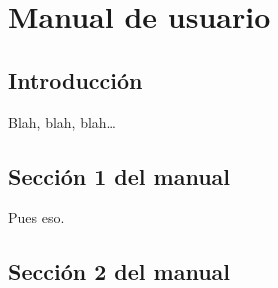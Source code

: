 
\chapter{Manual de usuario}
\label{cha:manual-de-usuario}

\section{Introducción}
\label{sec:intro-manual-de-usuario}

Blah, blah, blah\ldots


\section{Sección 1 del manual}
\label{sec:manual-1}

Pues eso.


\section{Sección 2 del manual}
\label{sec:manual-2}




